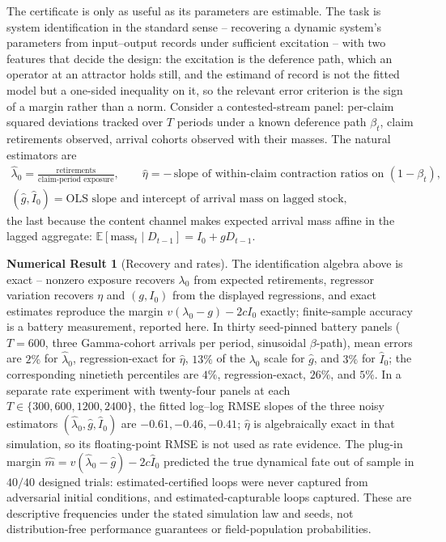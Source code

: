 \documentclass[11pt]{article}
\theoremstyle{definition}
\newtheorem{numresult}[theorem]{Numerical Result}
\theoremstyle{remark}
\numberwithin{equation}{section}
\newcommand{\E}{\mathbb{E}}
\begin{document}
The certificate is only as useful as its parameters are estimable. The task is system identification in the standard sense -- recovering a dynamic system's parameters from input--output records under sufficient excitation \citep{ljung1999system} -- with two features that decide the design: the excitation is the deference path, which an operator at an attractor holds still, and the estimand of record is not the fitted model but a one-sided inequality on it, so the relevant error criterion is the sign of a margin rather than a norm. Consider a contested-stream panel: per-claim squared deviations tracked over $T$ periods under a known deference path $\beta_t$, claim retirements observed, arrival cohorts observed with their masses. The natural estimators are
\begin{gather*}
\hat\lambda_0=\frac{\text{retirements}}{\text{claim-period exposure}},
\qquad
\hat\eta=-\,\text{slope of within-claim contraction ratios on }(1-\beta_t),\\[2pt]
(\hat g,\hat I_0)=\text{OLS slope and intercept of arrival mass on lagged stock},
\end{gather*}
the last because the content channel makes expected arrival mass affine in the lagged aggregate: $\E[\text{mass}_t\mid D_{t-1}]=I_0+gD_{t-1}$.

\begin{numresult}[Recovery and rates]\label{prop:id}
The identification algebra above is exact -- nonzero exposure recovers $\lambda_0$ from expected retirements, regressor variation recovers $\eta$ and $(g, I_0)$ from the displayed regressions, and exact estimates reproduce the margin $v(\lambda_0-g)-2cI_0$ exactly; finite-sample accuracy is a battery measurement, reported here. In thirty seed-pinned battery panels ($T=600$, three Gamma-cohort arrivals per period, sinusoidal $\beta$-path), mean errors are $2\%$ for $\hat\lambda_0$, regression-exact for $\hat\eta$, $13\%$ of the $\lambda_0$ scale for $\hat g$, and $3\%$ for $\hat I_0$; the corresponding ninetieth percentiles are $4\%$, regression-exact, $26\%$, and $5\%$. In a separate rate experiment with twenty-four panels at each $T\in\{300,600,1200,2400\}$, the fitted log--log RMSE slopes of the three noisy estimators $(\hat\lambda_0,\hat g,\hat I_0)$ are $-0.61,-0.46,-0.41$; $\hat\eta$ is algebraically exact in that simulation, so its floating-point RMSE is not used as rate evidence. The plug-in margin $\hat m=v(\hat\lambda_0-\hat g)-2c\hat I_0$ predicted the true dynamical fate out of sample in $40/40$ designed trials: estimated-certified loops were never captured from adversarial initial conditions, and estimated-capturable loops captured. These are descriptive frequencies under the stated simulation law and seeds, not distribution-free performance guarantees or field-population probabilities.
\end{numresult}
\end{document}
